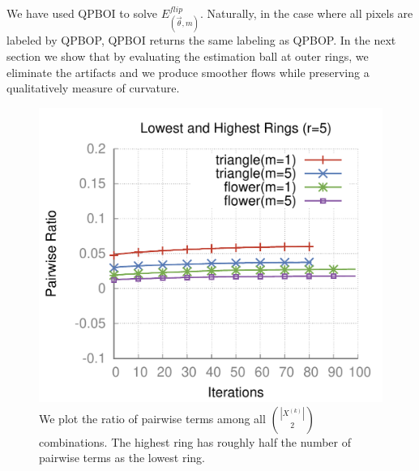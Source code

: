   We have used QPBOI to solve $E_{(\vec{\theta},m)}^{flip}$. Naturally, in the case where all pixels are labeled by QPBOP, QPBOI returns the same labeling as QPBOP. In the next section we show that by evaluating the estimation ball at outer rings, we eliminate the artifacts and we produce smoother flows while preserving a qualitatively measure of curvature.


\begin{figure}
\center
\includegraphics[scale=0.5]{figures/chapter6/unlabeled-ratio/plots/pairwise-ratio/h0.25/radius-5/plot-pairwiseratio-lowerHigher-concavities-probe.pdf}
\caption{We plot the ratio of pairwise terms among all $\binom{|X^{(k)}|}{2}$ combinations. The highest ring has roughly half the number of pairwise terms as the lowest ring.}
\label{fig:ratio-pairwise-terms}
\end{figure}


